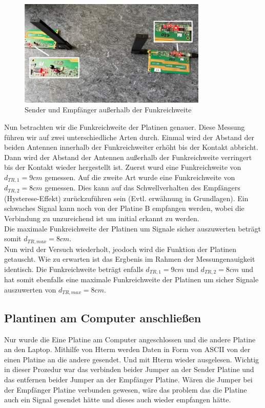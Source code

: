 \begin{figure}[H]
    \centering
    \includegraphics[width=0.8\textwidth]{Pictures/Task2a.jpg}
    \caption{Sender und Empfänger außerhalb der Funkreichweite}
    \label{fig:Task2a}
\end{figure}
Nun betrachten wir die Funkreichweite der Platinen genauer. Diese Messung führen wir auf zwei unterschiedliche
Arten durch. Einmal wird der Abstand der beiden Antennen innerhalb der Funkreichweiter erhöht bis der Kontakt
abbricht. Dann wird der Abstand der Antennen außerhalb der Funkreichweite verringert bis der Kontakt wieder
hergestellt ist. Zuerst wurd eine Funkreichweite von $d_{TR,1}=9cm$ gemessen. Auf die zweite Art wurde eine
Funkreichweite von $d_{TR,2}=8cm$ gemessen. Dies kann auf das Schwellverhalten des Empfängers (Hysterese-Effekt)
zurückzuführen sein (Evtl. erwähnung in Grundlagen). 
Ein schwaches Signal kann noch von der Platine B empfangen werden, wobei die Verbindung zu unzureichend ist um 
initial erkannt zu werden.\\
Die maximale Funkreichweite der Platinen um Signale sicher auszuwerten beträgt somit $d_{TR,max}=8cm$.
\\
Nun wird der Versuch wiederholt, jeodoch wird die Funktion der Platinen getauscht. Wie zu erwarten ist das Ergbenis
im Rahmen der Messungenauigkeit identisch. Die Funkreichweite beträgt enfalls $d_{TR,1}=9cm$ und $d_{TR,2}=8cm$ und 
hat somit ebenfalls eine maximale Funkreichweite der Platinen um sicher Signale auszuwerten von $d_{TR,max}=8cm$.

\subsection{Plantinen am Computer anschließen}
Nur wurde die Eine Platine am Computer angeschlossen und die andere Platine an den Laptop.
Mithilfe von Hterm werden Daten in Form von ASCII von der einen Platine an die andere gesendet.
Und mit Hterm wieder ausgelesen.
Wichtig in dieser Prozedur war das verbinden beider Jumper an der Sender Platine und das entfernen beider
Jumper an der Empfänger Platine. 
Wären die Jumper bei der Empfänger Platine verbunden gewesen, wäre das problem das die Platine auch 
ein Signal gesendet hätte und dieses auch wieder empfangen hätte.

